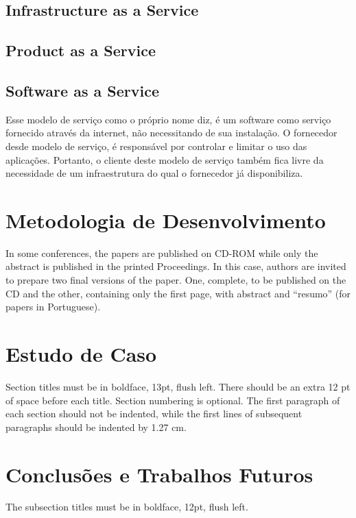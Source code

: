 \documentclass[12pt]{article}
\begin{document}
\subsection{Infrastructure as a Service}

\subsection{Product as a Service}

\subsection{Software as a Service}
Esse modelo de serviço como o próprio nome diz, é um software como serviço fornecido através da internet, não necessitando de sua instalação. O fornecedor desde modelo de serviço, é responsável por controlar e limitar o uso das aplicações. Portanto, o cliente deste modelo de serviço também fica livre da necessidade de um infraestrutura do qual o fornecedor já disponibiliza.

\section{Metodologia de Desenvolvimento}

In some conferences, the papers are published on CD-ROM while only the
abstract is published in the printed Proceedings. In this case, authors are
invited to prepare two final versions of the paper. One, complete, to be
published on the CD and the other, containing only the first page, with
abstract and ``resumo'' (for papers in Portuguese).

\section{Estudo de Caso}

Section titles must be in boldface, 13pt, flush left. There should be an extra
12 pt of space before each title. Section numbering is optional. The first
paragraph of each section should not be indented, while the first lines of
subsequent paragraphs should be indented by 1.27 cm.

\section{Conclusões e Trabalhos Futuros}

The subsection titles must be in boldface, 12pt, flush left.
\end{document}
